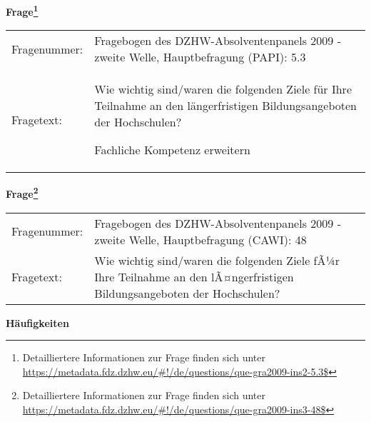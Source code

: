				\vspace*{0.5cm}
                \noindent\textbf{Frage\footnote{Detailliertere Informationen zur Frage finden sich unter
		              \url{https://metadata.fdz.dzhw.eu/\#!/de/questions/que-gra2009-ins2-5.3$}}}\\
				\begin{tabularx}{\hsize}{@{}lX}
					Fragenummer: &
					  Fragebogen des DZHW-Absolventenpanels 2009 - zweite Welle, Hauptbefragung (PAPI):
					  5.3
 \\
					Fragetext: & Wie wichtig sind/waren die folgenden Ziele für Ihre Teilnahme an den längerfristigen Bildungsangeboten der Hochschulen?\par  Fachliche Kompetenz erweitern \\
				\end{tabularx}
				\vspace*{0.5cm}
                \noindent\textbf{Frage\footnote{Detailliertere Informationen zur Frage finden sich unter
		              \url{https://metadata.fdz.dzhw.eu/\#!/de/questions/que-gra2009-ins3-48$}}}\\
				\begin{tabularx}{\hsize}{@{}lX}
					Fragenummer: &
					  Fragebogen des DZHW-Absolventenpanels 2009 - zweite Welle, Hauptbefragung (CAWI):
					  48
 \\
					Fragetext: & Wie wichtig sind/waren die folgenden Ziele fÃ¼r Ihre Teilnahme an den lÃ¤ngerfristigen Bildungsangeboten der Hochschulen? \\
				\end{tabularx}





        		\vspace*{0.5cm}
                \noindent\textbf{Häufigkeiten}

